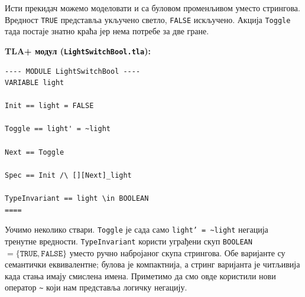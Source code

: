 \begin{primer}
Исти прекидач можемо моделовати и са буловом променљивом уместо стрингова.
Вредност \texttt{TRUE} представља укључено светло, \texttt{FALSE} искључено.
Акција \texttt{Toggle} тада постаје знатно краћа јер нема потребе за две гране.

\textbf{TLA+ модул (\texttt{LightSwitchBool.tla}):}
\begin{lstlisting}
---- MODULE LightSwitchBool ----
VARIABLE light

Init == light = FALSE

Toggle == light' = ~light

Next == Toggle

Spec == Init /\ [][Next]_light

TypeInvariant == light \in BOOLEAN
====
\end{lstlisting}

Уочимо неколико ствари. \texttt{Toggle} је сада само \texttt{light' = \textasciitilde light} негација тренутне вредности.
\texttt{TypeInvariant} користи уграђени скуп \texttt{BOOLEAN} $= \{\texttt{TRUE}, \texttt{FALSE}\}$ уместо ручно набројаног скупа стрингова.
Обе варијанте су семантички еквивалентне; булова је компактнија, а стринг варијанта је читљивија када стања имају смислена имена. Приметимо
да смо овде користили нови оператор \texttt{\~} који нам представља логичку негацију.
\end{primer}


